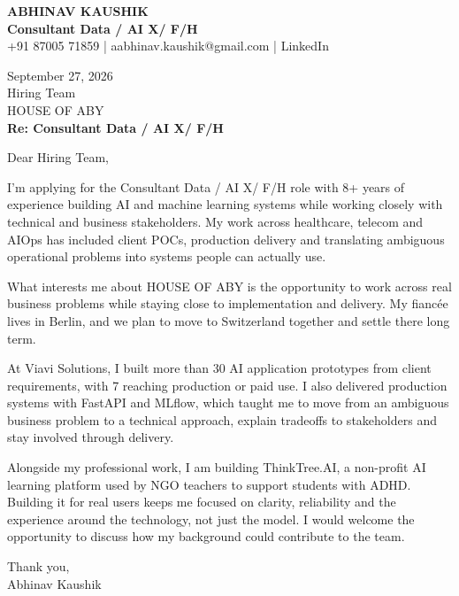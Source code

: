 \documentclass[10pt,a4paper]{article}
\begin{document}
\begin{center}
{\Large\bfseries ABHINAV KAUSHIK}\\[2pt]
{\bfseries Consultant Data / AI X/ F/H}\\[2pt]
+91 87005 71859 \quad | \quad aabhinav.kaushik@gmail.com \quad | \quad LinkedIn
\end{center}
\vspace{8pt}
September 27, 2026\\[6pt]
Hiring Team\\
HOUSE OF ABY\\[4pt]
\textbf{Re: Consultant Data / AI X/ F/H}

Dear Hiring Team,

I’m applying for the Consultant Data / AI X/ F/H role with 8+ years of experience building AI and machine learning systems while working closely with technical and business stakeholders. My work across healthcare, telecom and AIOps has included client POCs, production delivery and translating ambiguous operational problems into systems people can actually use.

What interests me about HOUSE OF ABY is the opportunity to work across real business problems while staying close to implementation and delivery. My fiancée lives in Berlin, and we plan to move to Switzerland together and settle there long term.

At Viavi Solutions, I built more than 30 AI application prototypes from client requirements, with 7 reaching production or paid use. I also delivered production systems with FastAPI and MLflow, which taught me to move from an ambiguous business problem to a technical approach, explain tradeoffs to stakeholders and stay involved through delivery.

Alongside my professional work, I am building ThinkTree.AI, a non-profit AI learning platform used by NGO teachers to support students with ADHD. Building it for real users keeps me focused on clarity, reliability and the experience around the technology, not just the model. I would welcome the opportunity to discuss how my background could contribute to the team.

Thank you,\\
Abhinav Kaushik
\end{document}
